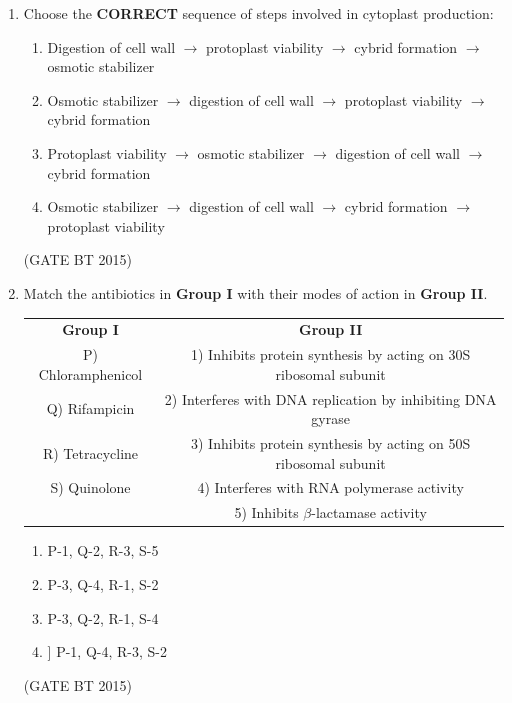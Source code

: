 \documentclass[journal,12pt,onecolumn]{IEEEtran}
\begin{document}
\begin{enumerate}[label=\textbf{Q.\arabic*}]
\item Choose the \textbf{CORRECT} sequence of steps involved in cytoplast production:

\begin{enumerate}
    \item Digestion of cell wall $\rightarrow$ protoplast viability $\rightarrow$ cybrid formation $\rightarrow$ osmotic stabilizer \\
    \item Osmotic stabilizer $\rightarrow$ digestion of cell wall $\rightarrow$ protoplast viability $\rightarrow$ cybrid formation \\
    \item Protoplast viability $\rightarrow$ osmotic stabilizer $\rightarrow$ digestion of cell wall $\rightarrow$ cybrid formation \\
    \item Osmotic stabilizer $\rightarrow$ digestion of cell wall $\rightarrow$ cybrid formation $\rightarrow$ protoplast viability \\
\end{enumerate} 
\hfill (GATE BT 2015)

\item Match the antibiotics in \textbf{Group I} with their modes of action in \textbf{Group II}.  

\begin{table}[H]
\begin{tabular}{cc}
\textbf{Group I} & \textbf{Group II} \\
P) Chloramphenicol      & 1) Inhibits protein synthesis by acting on 30S ribosomal subunit \\
Q) Rifampicin           & 2) Interferes with DNA replication by inhibiting DNA gyrase \\
R) Tetracycline         & 3) Inhibits protein synthesis by acting on 50S ribosomal subunit \\
S) Quinolone            & 4) Interferes with RNA polymerase activity \\
                        & 5) Inhibits $\beta$-lactamase activity \\
\end{tabular}
\end{table}

\begin{multicols}{2}
\begin{enumerate}
    \item P-1, Q-2, R-3, S-5
    \item P-3, Q-4, R-1, S-2
    \item P-3, Q-2, R-1, S-4
    \item] P-1, Q-4, R-3, S-2
\end{enumerate}
\end{multicols}\hfill (GATE BT 2015)







\end{enumerate}
\end{document}
